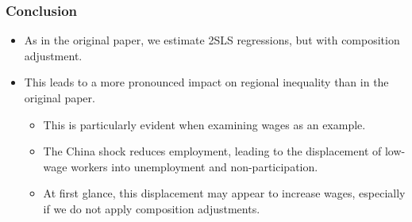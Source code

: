 \begin{frame}
    \frametitle{Conclusion}

    \begin{itemize}
        \item As in the original paper, we estimate 2SLS regressions, but with composition adjustment.  
        
        \item This leads to a more pronounced impact on regional inequality than in the original paper.
        
        \begin{itemize}
            \item This is particularly evident when examining wages as an example.
            
            \item The China shock reduces employment, leading to the displacement of low-wage workers into unemployment and non-participation.
            
            \item At first glance, this displacement may appear to increase wages, especially if we do not apply composition adjustments.
        \end{itemize}
    \end{itemize}

\end{frame}